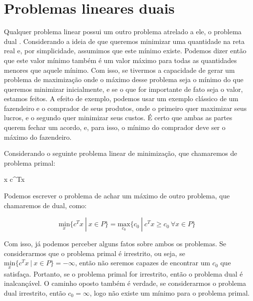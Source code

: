 \section{Problemas lineares duais}
\label{sec_prob_dual}

\noindent
Qualquer problema linear possui um outro problema atrelado a ele, o problema dual \cite{fischetti2019}.
Considerando a ideia de que queremos minimizar uma quantidade na reta real e, por
simplicidade, assumimos que este mínimo existe. Podemos dizer então que este valor
mínimo também é um valor máximo para todas as quantidades menores que aquele mínimo. Com
isso, se tivermos a capacidade de gerar um problema de maximização onde o máximo desse
problema seja o mínimo do que queremos minimizar inicialmente, e se o que for importante de
fato seja o valor, estamos feitos. A efeito de exemplo, podemos usar um exemplo clássico de
um fazendeiro e o comprador de seus produtos, onde o primeiro quer maximizar seus lucros, e
o segundo quer minimizar seus custos. É certo que ambas as partes querem fechar um acordo, e,
para isso, o mínimo do comprador deve ser o máximo do fazendeiro.

Considerando o seguinte problema linear de minimização, que chamaremos de problema primal:

\vspace{-15pt}
\begin{mini!}
{x}{ c^Tx \label{duall_obj}}{\label{prob_duall}}{}
\end{mini!}

Podemos escrever o problema de achar um máximo de outro problema, que chamaremos de dual, como:

\begin{equation}
\underset{x}{\mathrm{min}}\{c^Tx\ |\ x \in P \} = \underset{c_0}{\mathrm{max}}\{c_0\ |\ c^Tx \geq c_0\ \forall x \in P\}
\end{equation}

Com isso, já podemos perceber alguns fatos sobre ambos os problemas. Se considerarmos que o
problema primal é irrestrito, ou seja, se \(\underset{x}{\mathrm{min}}\{c^Tx\ |\ x \in P\} = - \infty \),
então não seremos capazes de encontrar um \(c_0\) que satisfaça. Portanto, se o problema primal
for irrestrito, então o problema dual é inalcançável. O caminho oposto também é verdade, se
considerarmos o problema dual irrestrito, então \(c_0 = \infty\), logo não existe um mínimo para o problema
primal.

